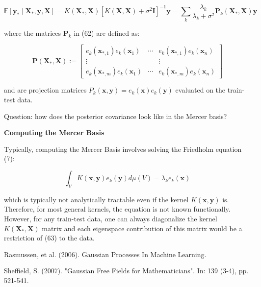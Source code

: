 \documentclass[11pt]{article}
\theoremstyle{plain} %
\theoremstyle{remark}
\begin{document}
$$
    \mathbb{E}\left[\mathbf{y}_{*} \mid \mathbf{X}_{*}, \mathbf{y}, \mathbf{X}\right]
    =K\left(\mathbf{X}_{*}, \mathbf{X}\right)\left[K(\mathbf{X}, \mathbf{X})+\sigma^{2} \mathbf{I}\right]^{-1} \mathbf{y} 
    =\sum_{k} \frac{\lambda_{k}}{\lambda_{k}+\sigma^{2}} \mathbf{P}_{k}\left(\mathbf{X}_{*}, \mathbf{X}\right) \mathbf{y}
$$

where the matrices $\mathbf{P}_{k}$ in (62) are defined as:

$$
  \mathbf{P}\left(\mathbf{X}_{*}, \mathbf{X}\right):=\left[\begin{array}{ccc}
      e_{k}\left(\mathbf{x}_{*, 1}\right) e_{k}\left(\mathbf{x}_{1}\right) & \cdots & e_{k}\left(\mathbf{x}_{*, 1}\right) e_{k}\left(\mathbf{x}_{n}\right) \\
      \vdots                                                               &        & \vdots                                                               \\
      e_{k}\left(\mathbf{x}_{*, m}\right) e_{k}\left(\mathbf{x}_{1}\right) & \cdots & e_{k}\left(\mathbf{x}_{*, m}\right) e_{k}\left(\mathbf{x}_{n}\right)
    \end{array}\right]
$$

and are projection matrices $P_{k}(\mathbf{x}, \mathbf{y})=e_{k}(\mathbf{x})
  e_{k}(\mathbf{y})$ evaluated on the train-test data.

Question: how does the posterior covariance look like in the Mercer basis?

\textbf{Computing the Mercer Basis}

Typically, computing the Mercer Basis involves solving the Friedholm equation
(7):

$$
  \int_{V} K(\mathbf{x}, \mathbf{y}) e_{k}(\mathbf{y}) d \mu(V)=\lambda_{k} e_{k}(\mathbf{x})
$$

which is typically not analytically tractable even if the kernel $K(\mathbf{x},
  \mathbf{y})$ is. Therefore, for most general kernels, the equation is not known
functionally. However, for any train-test data, one can always diagonalize the
kernel $K\left(\mathbf{X}_{*}, \mathbf{X}\right)$ matrix and each eigenspace
contribution of this matrix would be a restriction of (63) to the data.

\begin{thebibliography}{2}
  Rasmussen, et al. (2006). Gaussian Processes In Machine Learning.

  Sheffield, S. (2007). "Gaussian Free Fields for Mathematicians". In: 139 (3-4), pp. 521-541.
\end{thebibliography}
\end{document}
